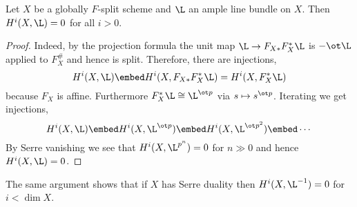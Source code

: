 \documentclass[12pt]{article}
\begin{document}
\begin{prop}
Let $X$ be a globally $F$-split scheme and $\L$ an ample line bundle on $X$. Then $H^i(X, \L) = 0$ for all $i > 0$.
\end{prop}

\begin{proof}
Indeed, by the projection formula the unit map $\L \to F_{X*} F_X^* \L$ is $- \ot \L$ applied to $F_X^{\#}$ and hence is split. Therefore, there are injections,
\[ H^i(X, \L) \embed H^i(X, F_{X*} F_X^* \L) = H^i(X, F_X^* \L) \]
because $F_X$ is affine. Furthermore $F_X^* \L \cong \L^{\ot p}$ via $s \mapsto s^{\ot p}$. Iterating we get injections,
\[ H^i(X, \L) \embed H^i(X, \L^{\ot p}) \embed H^i(X, \L^{\ot p^2}) \embed \cdots \]
By Serre vanishing we see that $H^i(X, \L^{p^n}) = 0$ for $n \gg 0$ and hence $H^i(X, \L) = 0$.
\end{proof}

\begin{rmk}
The same argument shows that if $X$ has Serre duality then $H^i(X, \L^{-1}) = 0$ for $i < \dim{X}$.
\end{rmk}
\end{document}
